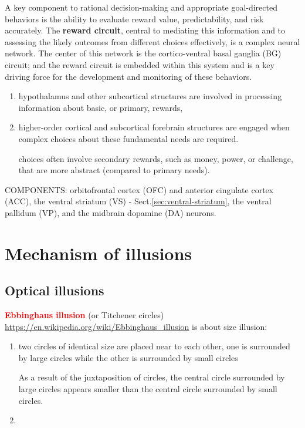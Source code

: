 A key component to rational decision-making and appropriate goal-directed
behaviors is the ability to evaluate reward value, predictability, and risk
accurately. The {\bf reward circuit}, central to mediating this information and
to assessing the likely outcomes from different choices effectively, is a
complex neural network. The center of this network is the cortico-ventral
basal ganglia (BG) circuit; and the reward circuit is embedded within this
system and is a key driving force for the development and monitoring of these
behaviors.

\begin{enumerate}

  \item  hypothalamus and other subcortical structures are involved in
  processing information about basic, or primary, rewards, 
  
  \item higher-order cortical and subcortical forebrain structures are engaged
  when complex choices about these fundamental needs are required. 

choices often involve secondary rewards, such as money, power, or challenge,
that are more abstract (compared to primary needs).
\end{enumerate}

COMPONENTS: orbitofrontal cortex (OFC) and anterior cingulate cortex (ACC), the
ventral striatum (VS) - Sect.\ref{sec:ventral-striatum}, the
ventral pallidum (VP), and the midbrain dopamine (DA) neurons.

\chapter{Mechanism of illusions}

\section{Optical illusions}
\label{sec:optical-illusions}

\textcolor{red}{\bf Ebbinghaus illusion} (or  Titchener circles) \url{https://en.wikipedia.org/wiki/Ebbinghaus_illusion}
is about size illusion:
\begin{enumerate}
  \item  two circles of identical size are placed near to each other, 
  one is surrounded by large circles while the other is surrounded by small circles
  
  As a result of the juxtaposition of circles, the central circle surrounded by
  large circles appears smaller than the central circle surrounded by small
  circles.


  \item
\end{enumerate}

